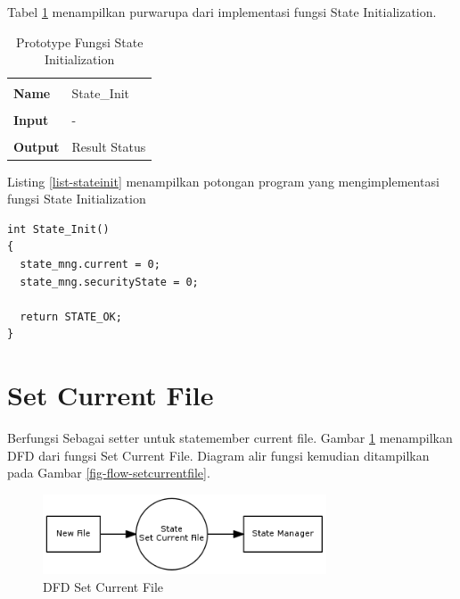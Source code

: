 Tabel \ref{tabel-stateinit} menampilkan purwarupa dari implementasi fungsi State Initialization. 

\begin{table}[!h]
  \centering
  \begin{tabular}{p{2cm} p{8cm}}
    \hline\\
    {\bf Name} & State\_Init\\
    \hline\\
    {\bf Input} & -
    \\
    \hline\\
    {\bf Output} & Result Status
    \\
    \hline
  \end{tabular}
  \caption{Prototype Fungsi State Initialization}
  \label{tabel-stateinit}
\end{table}

Listing \ref{list-stateinit} menampilkan potongan program yang mengimplementasi fungsi State Initialization

\begin{lstlisting}[caption={Listing Program Fungsi State Initialization}, label={list-stateinit}]
int State_Init()
{
  state_mng.current = 0;
  state_mng.securityState = 0;

  return STATE_OK; 
}
\end{lstlisting}


\section{Set Current File}
\label{sec_setcurrentfile}

Berfungsi Sebagai setter untuk statemember current file. Gambar \ref{fig-dfd-setcurrentfile} menampilkan DFD dari fungsi Set Current File. Diagram alir fungsi kemudian ditampilkan pada Gambar \ref{fig-flow-setcurrentfile}. 

\begin{figure}[h]
\centering
\includegraphics[width=0.75\textwidth]{image/state/dfd_setcurrentfile.png}
\caption{DFD Set Current File}
\label{fig-dfd-setcurrentfile}
\end{figure}

